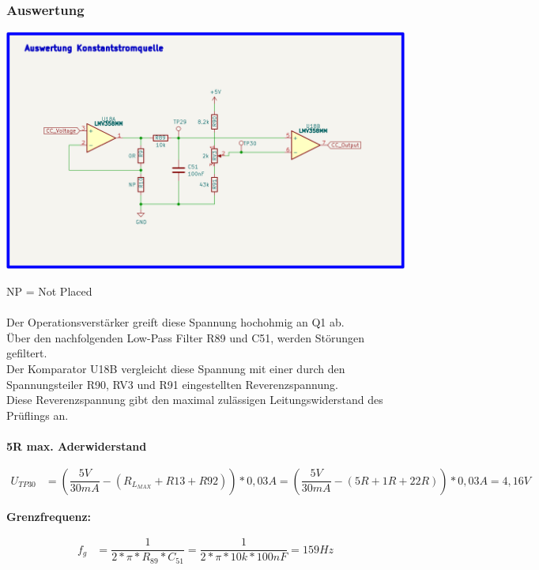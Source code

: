 \subsubsection{Auswertung}
\begin{center}
\includegraphics[width=15cm]{Bilder/Auswertung.png}
\end{center}
NP = Not Placed
\\
\\
Der Operationsverstärker greift diese Spannung hochohmig an Q1 ab. 
\\
Über den nachfolgenden Low-Pass Filter R89 und C51, werden Störungen gefiltert.
\\
Der Komparator U18B vergleicht diese Spannung mit einer durch den Spannungsteiler R90, RV3 und R91 eingestellten Reverenzspannung. 
\\
Diese Reverenzspannung gibt den maximal zulässigen Leitungswiderstand des Prüflings an. 
\\
\\
\textbf{5R max. Aderwiderstand}
\\
\begin{center}
\begin{align*}
	U_{TP30} &= (\dfrac{5V}{30mA} - (R_{L_{MAX}} + R13 + R92)) * 0,03A = (\dfrac{5V}{30mA} - (5R + 1R + 22R)) * 0,03A = 4,16V
\end{align*}
\end{center}
\textbf{Grenzfrequenz:}
\begin{center}
\begin{align*}
	f_{g} &= \dfrac{1}{2 * \pi * R_{89} * C_{51}} = \dfrac{1}{2 * \pi * 10k * 100nF} = 159Hz
\end{align*}
\end{center}

\newpage
